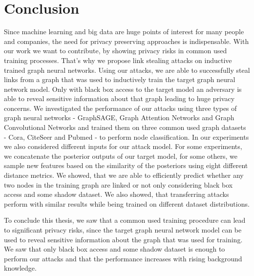 \chapter{Conclusion}
    Since machine learning and big data are huge points of interest for many people and companies, the need for privacy preserving approaches is indispensable.
    With our work we want to contribute, by showing privacy risks in common used training processes.
    That's why we propose link stealing attacks on inductive trained graph neural networks.
    Using our attacks, we are able to successfully steal links from a graph that was used to inductively train the target graph neural network model.
    Only with black box access to the target model an adversary is able to reveal sensitive information about that graph leading to huge privacy concerns.
    We investigated the performance of our attacks using three types of graph neural networks - GraphSAGE, Graph Attention Networks and Graph Convolutional Networks and trained them on three common used graph datasets - Cora, CiteSeer and Pubmed - to perform node classification.
    In our experiments we also considered different inputs for our attack model.
    For some experiments, we concatenate the posterior outputs of our target model, for some others, we sample new features based on the similarity of the posteriors using eight different distance metrics.   
    We showed, that we are able to efficiently predict whether any two nodes in the training graph are linked or not only considering black box access and some shadow dataset.
    We also showed, that transferring attacks perform with similar results while being trained on different dataset distributions.

    To conclude this thesis, we saw that a common used training procedure can lead to significant privacy risks, since the target graph neural network model can be used to reveal sensitive information about the graph that was used for training.
    We saw that only black box access and some shadow dataset is enough to perform our attacks and that the performance increases with rising background knowledge.
